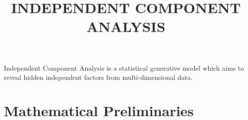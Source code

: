 \documentclass[11pt, a4paper]{article}
\begin{document}
\title{INDEPENDENT COMPONENT ANALYSIS}
\date{}
\maketitle

Independent Component Analysis is a statistical generative model which aims to reveal hidden independent factors from multi-dimensional data.

\section{Mathematical Preliminaries}
\end{document}
